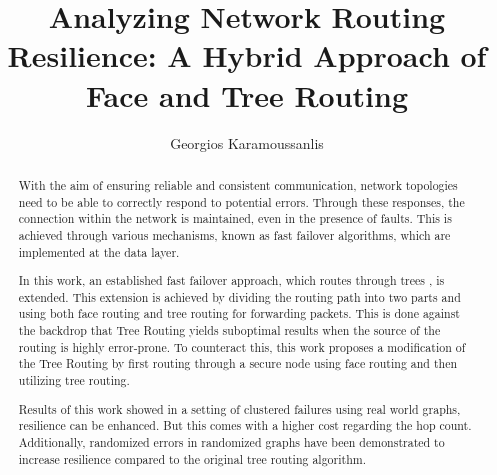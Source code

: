 \documentclass[a4paper,UKenglish,cleveref, autoref, thm-restate,dvipsnames]{lipics-v2021}
\title{Analyzing Network Routing Resilience: A Hybrid Approach of Face and Tree Routing}
\author{Georgios Karamoussanlis}{TU Dortmund, Germany}{georgios.karamoussanlis@tu-dortmund.de}{}{}
\begin{document}
\maketitle

\begin{abstract}
With the aim of ensuring reliable and consistent communication, network topologies need to be able to correctly respond to potential errors. Through these responses, the connection within the network is maintained, even in the presence of faults. This is achieved through various mechanisms, known as fast failover algorithms, which are implemented at the data layer.

In this work, an established fast failover approach, which routes through trees \cite{tree}, is extended. This extension is achieved by dividing the routing path into two parts and using both face routing and tree routing for forwarding packets.
This is done against the backdrop that Tree Routing yields suboptimal results when the source of the routing is highly error-prone. To counteract this, this work proposes a modification of the Tree Routing by first routing through a secure node using face routing and then utilizing tree routing.

Results of this work showed in a setting of clustered failures using real world graphs, resilience can be enhanced. But this comes with a higher cost regarding the hop count.
Additionally, randomized errors in randomized graphs have been demonstrated to increase resilience compared to the original tree routing algorithm.




\end{abstract}
\end{document}
